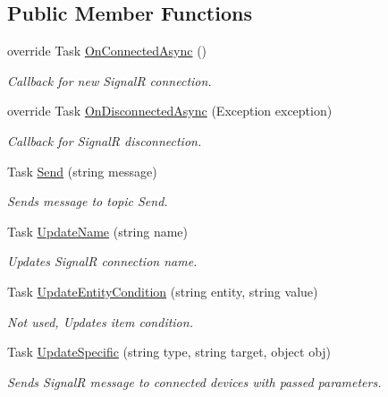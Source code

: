 \subsection*{Public Member Functions}
\begin{DoxyCompactItemize}
\item 
override Task \mbox{\hyperlink{class_f_w_p_s_1_1_devices_hub_aca0b77bc4434e8b29985876931c96c16}{On\+Connected\+Async}} ()
\begin{DoxyCompactList}\small\item\em Callback for new SignalR connection. \end{DoxyCompactList}\item 
override Task \mbox{\hyperlink{class_f_w_p_s_1_1_devices_hub_a75c74048ac8d2eccb161ee770bd04aeb}{On\+Disconnected\+Async}} (Exception exception)
\begin{DoxyCompactList}\small\item\em Callback for SignalR disconnection. \end{DoxyCompactList}\item 
Task \mbox{\hyperlink{class_f_w_p_s_1_1_devices_hub_ae1ae1078929eaa4b46e653ce66e91d85}{Send}} (string message)
\begin{DoxyCompactList}\small\item\em Sends message to topic \textquotesingle{}Send\textquotesingle{}. \end{DoxyCompactList}\item 
Task \mbox{\hyperlink{class_f_w_p_s_1_1_devices_hub_a9ef83a80ed7ebcbaafc5fa4970c65875}{Update\+Name}} (string name)
\begin{DoxyCompactList}\small\item\em Updates SignalR connection name. \end{DoxyCompactList}\item 
Task \mbox{\hyperlink{class_f_w_p_s_1_1_devices_hub_a6d952a1d6529e35a7c4ab9260e576b5a}{Update\+Entity\+Condition}} (string entity, string value)
\begin{DoxyCompactList}\small\item\em Not used, Updates item condition. \end{DoxyCompactList}\item 
Task \mbox{\hyperlink{class_f_w_p_s_1_1_devices_hub_a2922367d72f85098f4ae8fc883f81c05}{Update\+Specific}} (string type, string target, object obj)
\begin{DoxyCompactList}\small\item\em Sends SignalR message to connected devices with passed parameters. \end{DoxyCompactList}\end{DoxyCompactItemize}


